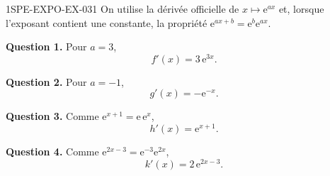 \begin{corrige}{1SPE-EXPO-EX-031}
On utilise la dérivée officielle de $x\mapsto\mathrm{e}^{ax}$ et, lorsque l'exposant contient une constante, la propriété $\mathrm{e}^{ax+b}=\mathrm{e}^{b}\mathrm{e}^{ax}$.

\textbf{Question 1.} Pour $a=3$,
\[f'(x) = 3\,\mathrm{e}^{3x}.\]

\textbf{Question 2.} Pour $a=-1$,
\[g'(x) = -\mathrm{e}^{-x}.\]

\textbf{Question 3.} Comme $\mathrm{e}^{x+1}=\mathrm{e}\,\mathrm{e}^{x}$,
\[h'(x) = \mathrm{e}^{x+1}.\]

\textbf{Question 4.} Comme $\mathrm{e}^{2x-3}=\mathrm{e}^{-3}\mathrm{e}^{2x}$,
\[k'(x) = 2\,\mathrm{e}^{2x-3}.\]
\end{corrige}

